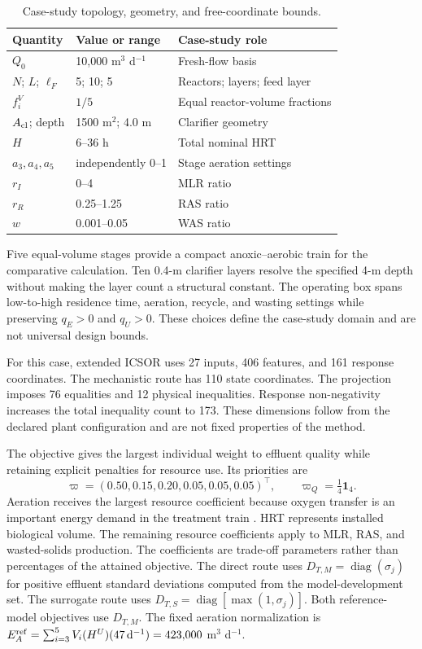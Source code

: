 \documentclass[a4paper,fleqn]{cas-sc}
\begin{document}
\begin{table}[pos=htbp]
\centering
\caption{Case-study topology, geometry, and free-coordinate bounds.}
\label{tab:domain}
\small
\begin{tabular}{lll}
\toprule
Quantity & Value or range & Case-study role\\
\midrule
$Q_0$ & 10,000 m$^3$ d$^{-1}$ & Fresh-flow basis\\
$N$; $L$; $\ell_F$ & 5; 10; 5 & Reactors; layers; feed layer\\
$f_i^V$ & $1/5$ & Equal reactor-volume fractions\\
$A_{\rm cl}$; depth & 1500 m$^2$; 4.0 m & Clarifier geometry\\
$H$ & 6--36 h & Total nominal HRT\\
$a_3,a_4,a_5$ & independently 0--1 & Stage aeration settings\\
$r_I$ & 0--4 & MLR ratio\\
$r_R$ & 0.25--1.25 & RAS ratio\\
$w$ & 0.001--0.05 & WAS ratio\\
\bottomrule
\end{tabular}
\end{table}

Five equal-volume stages provide a compact anoxic--aerobic train for the comparative calculation. Ten 0.4-m clarifier layers resolve the specified 4-m depth without making the layer count a structural constant. The operating box spans low-to-high residence time, aeration, recycle, and wasting settings while preserving $q_E>0$ and $q_U>0$. These choices define the case-study domain and are not universal design bounds.

For this case, extended ICSOR uses 27 inputs, 406 features, and 161 response coordinates. The mechanistic route has 110 state coordinates. The projection imposes 76 equalities and 12 physical inequalities. Response non-negativity increases the total inequality count to 173. These dimensions follow from the declared plant configuration and are not fixed properties of the method.

The objective gives the largest individual weight to effluent quality while retaining explicit penalties for resource use. Its priorities are
\begin{equation}
\varpi=(0.50,0.15,0.20,0.05,0.05,0.05)^\top,
\qquad \varpi_Q=\tfrac14\mathbf1_4.
\label{eq:caseweights}
\end{equation}
Aeration receives the largest resource coefficient because oxygen transfer is an important energy demand in the treatment train \citep{Leu2012}. HRT represents installed biological volume. The remaining resource coefficients apply to MLR, RAS, and wasted-solids production. The coefficients are trade-off parameters rather than percentages of the attained objective. The direct route uses $D_{T,M}=\operatorname{diag}(\sigma_j)$ for positive effluent standard deviations computed from the model-development set. The surrogate route uses $D_{T,S}=\operatorname{diag}[\max(1,\sigma_j)]$. Both reference-model objectives use $D_{T,M}$. The fixed aeration normalization is $E_A^{\rm ref}=\sum_{i=3}^{5}V_i(H^U)(47\,\mathrm{d}^{-1})=423{,}000$ m$^3$ d$^{-1}$.
\end{document}
